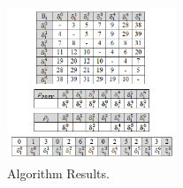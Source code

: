 \begin{figure}[h!]
\vspace{-10pt}
\begin{center}
\includegraphics[width=0.45\textwidth]{algo_example_3.png}
\caption{Algorithm Results.}
\label{fig:algo_example_3}
\end{center}
\vspace{-10pt}
\end{figure}
